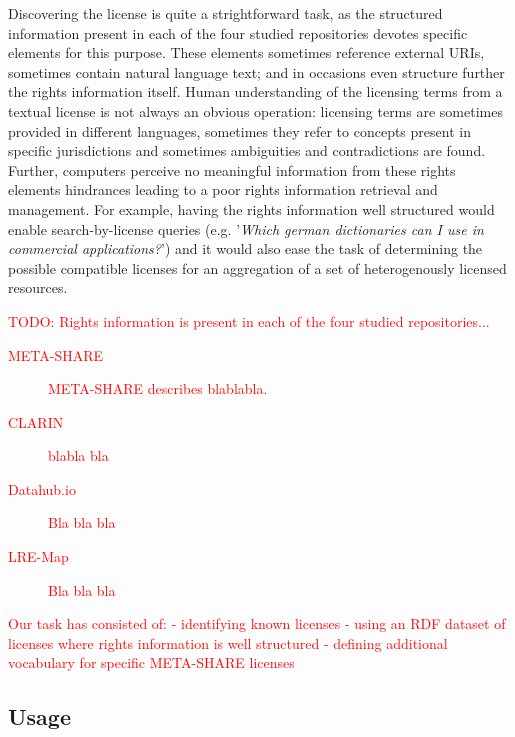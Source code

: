\documentclass[11pt]{article}
\begin{document}
Discovering the license is quite a strightforward task, as the structured information present in each of the four studied repositories devotes specific elements for this purpose. These elements sometimes reference external URIs, sometimes contain natural language text; and in occasions even structure further the rights information itself. Human understanding of the licensing terms from a textual license is not always an obvious operation: licensing terms are sometimes provided in different languages, sometimes they refer to concepts present in specific jurisdictions and sometimes ambiguities and contradictions are found. Further, computers perceive no meaningful information from these rights elements hindrances leading to a poor rights information retrieval and management. For example, having the rights information well structured would enable search-by-license queries (e.g. '\textit{Which german dictionaries can I use in commercial applications?}') and it would also ease the task of determining the possible compatible licenses for an aggregation of a set of heterogenously licensed resources.

\textcolor{red}{TODO:
Rights information is present in each of the four studied repositories...
\begin{description}
	\item[META-SHARE] META-SHARE describes blablabla. 
  \item[CLARIN] blabla bla
  \item[Datahub.io] Bla bla bla
  \item[LRE-Map] Bla bla bla
\end{description}
Our task has consisted of: 
- identifying known licenses
- using an RDF dataset of licenses where rights information is well structured
- defining additional vocabulary for specific META-SHARE licenses
}

\subsection{Usage}
\end{document}
